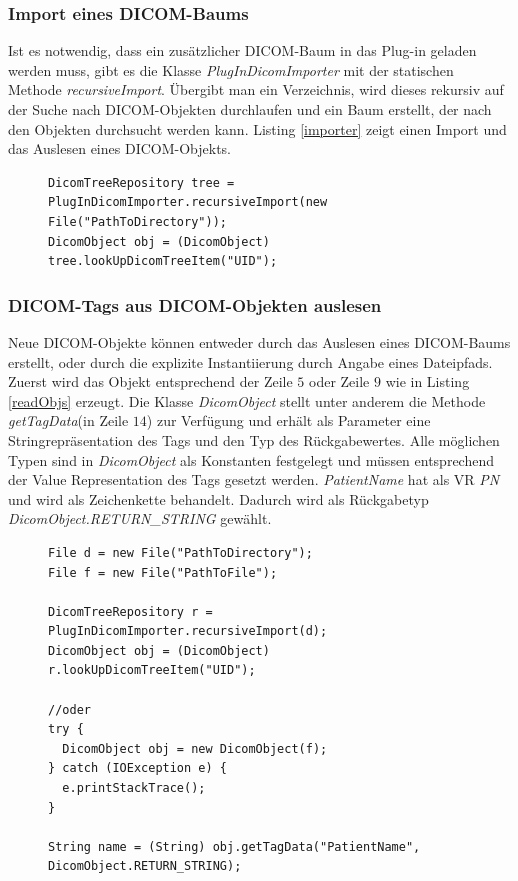 \subsubsection{Import eines DICOM-Baums}

Ist es notwendig, dass ein zusätzlicher DICOM-Baum in das Plug-in geladen werden muss, gibt es die Klasse \textit{PlugInDicomImporter} mit der statischen Methode \textit{recursiveImport}. Übergibt man ein Verzeichnis, wird dieses rekursiv auf der Suche nach DICOM-Objekten durchlaufen und ein Baum erstellt, der nach den Objekten durchsucht werden kann. Listing \ref{importer} zeigt einen Import und das Auslesen eines DICOM-Objekts.

\begin{figure}[htbp]
\begin{lstlisting}[frame=leftline]
DicomTreeRepository tree = PlugInDicomImporter.recursiveImport(new File("PathToDirectory"));
DicomObject obj = (DicomObject) tree.lookUpDicomTreeItem("UID");
\end{lstlisting}
\end{figure}

\subsubsection{DICOM-Tags aus DICOM-Objekten auslesen}
Neue DICOM-Objekte können entweder durch das Auslesen eines DICOM-Baums erstellt, oder durch die explizite Instantiierung durch Angabe eines Dateipfads. Zuerst wird das Objekt entsprechend der Zeile $5$ oder Zeile $9$ wie in Listing \ref{readObjs} erzeugt. Die Klasse \textit{DicomObject} stellt unter anderem die Methode \textit{getTagData}(in Zeile $14$) zur Verfügung und erhält als Parameter eine Stringrepräsentation des Tags und den Typ des Rückgabewertes. Alle möglichen Typen sind in \textit{DicomObject} als Konstanten festgelegt und müssen entsprechend der Value Representation des Tags gesetzt werden. \textit{PatientName} hat als VR \textit{PN} und wird als Zeichenkette behandelt. Dadurch wird als Rückgabetyp \textit{DicomObject.RETURN\_STRING} gewählt.

\begin{figure}[htbp]
\begin{lstlisting}[frame=leftline]
File d = new File("PathToDirectory");
File f = new File("PathToFile");
		
DicomTreeRepository r = PlugInDicomImporter.recursiveImport(d);
DicomObject obj = (DicomObject) r.lookUpDicomTreeItem("UID");
		
//oder
try {
  DicomObject obj = new DicomObject(f);
} catch (IOException e) {
  e.printStackTrace();
}
		
String name = (String) obj.getTagData("PatientName", DicomObject.RETURN_STRING);
\end{lstlisting}
\end{figure}

